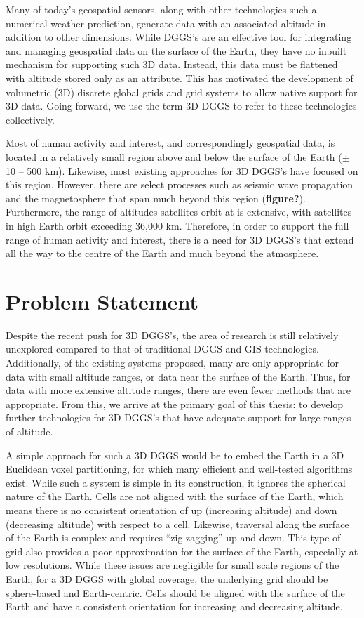 
Many of today's geospatial sensors, along with other technologies such a numerical weather prediction, generate data with an associated altitude in addition to other dimensions.
While DGGS's are an effective tool for integrating and managing geospatial data on the surface of the Earth, they have no inbuilt mechanism for supporting such 3D data.
Instead, this data must be flattened with altitude stored only as an attribute.
This has motivated the development of volumetric (3D) discrete global grids and grid systems to allow native support for 3D data.
Going forward, we use the term 3D DGGS to refer to these technologies collectively.


Most of human activity and interest, and correspondingly geospatial data, is located in a relatively small region above and below the surface of the Earth ($\pm$10 -- 500 km).
Likewise, most existing approaches for 3D DGGS's have focused on this region.
However, there are select processes such as seismic wave propagation and the magnetosphere that span much beyond this region (\textbf{figure?}).
Furthermore, the range of altitudes satellites orbit at is extensive, with satellites in high Earth orbit exceeding 36,000 km.
Therefore, in order to support the full range of human activity and interest, there is a need for 3D DGGS's that extend all the way to the centre of the Earth and much beyond the atmosphere.


\section{Problem Statement}
Despite the recent push for 3D DGGS's, the area of research is still relatively unexplored compared to that of traditional DGGS and GIS technologies.
Additionally, of the existing systems proposed, many are only appropriate for data with small altitude ranges, or data near the surface of the Earth.
Thus, for data with more extensive altitude ranges, there are even fewer methods that are appropriate. 
From this, we arrive at the primary goal of this thesis: to develop further technologies for 3D DGGS's that have adequate support for large ranges of altitude. 


A simple approach for such a 3D DGGS would be to embed the Earth in a 3D Euclidean voxel partitioning, for which many efficient and well-tested algorithms exist.
While such a system is simple in its construction, it ignores the spherical nature of the Earth.
Cells are not aligned with the surface of the Earth, which means there is no consistent orientation of up (increasing altitude) and down (decreasing altitude) with respect to a cell.
Likewise, traversal along the surface of the Earth is complex and requires ``zig-zagging'' up and down.
This type of grid also provides a poor approximation for the surface of the Earth, especially at low resolutions.
While these issues are negligible for small scale regions of the Earth, for a 3D DGGS with global coverage, the underlying grid should be sphere-based and Earth-centric.
Cells should be aligned with the surface of the Earth and have a consistent orientation for increasing and decreasing altitude.


